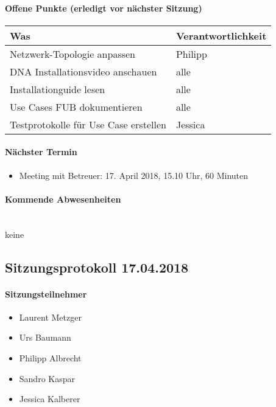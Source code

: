 \paragraph{Offene Punkte (erledigt vor nächster Sitzung)} \mbox{}

\begin{table}[H]
	\centering
	\begin{tabularx}{\textwidth}{X | p{4.5cm}}
		\rowcolor{gray!50}
		\textbf{Was} & \textbf{Verantwortlichkeit} \\
		\hline
		Netzwerk-Topologie anpassen & Philipp \\
		DNA Installationsvideo anschauen & alle \\
		Installationguide lesen & alle \\
		Use Cases FUB dokumentieren & alle \\	
		Testprotokolle für Use Case erstellen & Jessica \\
	\end{tabularx}
	\label{tab:my-label}
\end{table}

\paragraph{Nächster Termin}
\begin{itemize}	
	\item Meeting mit Betreuer: 17. April 2018, 15.10 Uhr, 60 Minuten
\end{itemize}

\paragraph{Kommende Abwesenheiten} \mbox{}\\
keine






\subsection{Sitzungsprotokoll 17.04.2018}

\paragraph{Sitzungsteilnehmer}
\begin{itemize}	
	\item Laurent Metzger 
	\item Urs Baumann
	\item Philipp Albrecht
	\item Sandro Kaspar
	\item Jessica Kalberer
\end{itemize}


